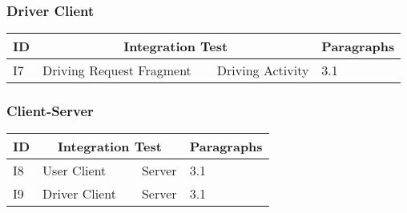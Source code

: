 \subsubsection{Driver Client} %
\label{ssub:driver_client}

\begin{tabular} { p{20.0pt} | p{135pt} p{20pt} p{100pt} | p{60pt} } \hline
	\textbf{ID} & \multicolumn {3}{|c|}{\textbf{Integration Test}} & \textbf{Paragraphs} \\ \hline
	I7 & Driving Request Fragment & \textrightarrow & Driving Activity & 3.1 \\ \hline
\end{tabular}

\subsubsection{Client-Server} %
\label{ssub:client_server}

\begin{tabular} { p{20.0pt} | p{135pt} p{20pt} p{100pt} | p{60pt} } \hline
	\textbf{ID} & \multicolumn {3}{|c|}{\textbf{Integration Test}} & \textbf{Paragraphs} \\ \hline
	I8 & User Client & \textrightarrow & Server & 3.1 \\ \hline
	I9 & Driver Client & \textrightarrow & Server & 3.1 \\ \hline
\end{tabular}



